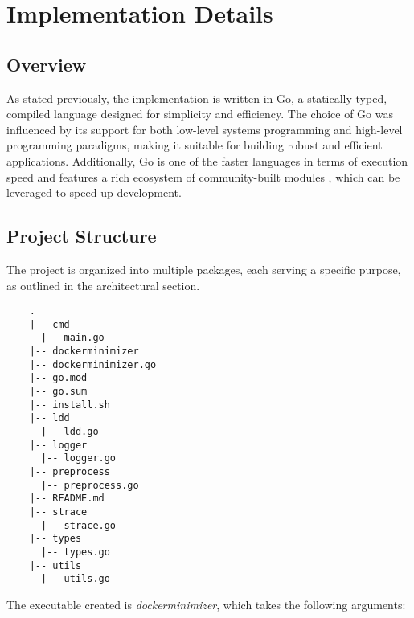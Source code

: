 \chapter{Implementation Details}
\label{chap:implementation-details}

\section{Overview}

As stated previously, the implementation is written in Go, a statically typed, compiled language designed for simplicity and efficiency. The choice of Go was influenced by its 
support for both low-level systems programming and high-level programming paradigms, making it suitable for building robust and efficient applications.
Additionally, Go is one of the faster languages in terms of execution speed and features a rich ecosystem of community-built modules \cite{go-pkg}, which can be leveraged to speed up development.


\section{Project Structure}

The project is organized into multiple packages, each serving a specific purpose, as outlined in the architectural section.

\lstset{language=bash,caption=Project Structure,label=lst:project-structure}
\begin{lstlisting}
    .
    |-- cmd
      |-- main.go
    |-- dockerminimizer
    |-- dockerminimizer.go
    |-- go.mod
    |-- go.sum
    |-- install.sh
    |-- ldd
      |-- ldd.go
    |-- logger
      |-- logger.go
    |-- preprocess
      |-- preprocess.go
    |-- README.md
    |-- strace
      |-- strace.go
    |-- types
      |-- types.go
    |-- utils
      |-- utils.go
\end{lstlisting}

The executable created is \textit{dockerminimizer}, which takes the following arguments:

